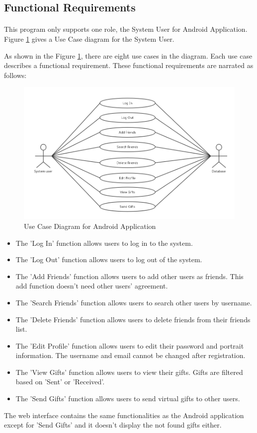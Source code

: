 \subsection{Functional Requirements}
\label{FunctionalRequirements}
\paragraph{}
This program only supports one role, the System User for Android Application. Figure \ref{Use Cases Diagram} gives a Use Case diagram for the System User.
\par As shown in the Figure \ref{Use Cases Diagram}, there are eight use cases in the diagram. Each use case describes a functional requirement. These functional requirements are narrated as follows:

\begin{figure}[htb]
\centering
\includegraphics[width=.5\textwidth]{section02/assets/UseCase.png}
\caption[Use Case Diagram for Android Application]{\label{Use Cases Diagram}Use Case Diagram for Android Application}
\end{figure}

\begin{itemize}
\item The 'Log In' function allows users to log in to the system.
\item The 'Log Out' function allows users to log out of the system.
\item The 'Add Friends' function allows users to add other users as friends. This add function doesn't need other users' agreement.
\item The 'Search Friends' function allows users to search other users by username.
\item The 'Delete Friends' function allows users to delete friends from their friends list.
\item The 'Edit Profile' function allows users to edit their password and portrait information. The username and email cannot be changed after registration. 
\item The 'View Gifts' function allows users to view their gifts. Gifts are filtered based on 'Sent' or 'Received'.
\item The 'Send Gifts' function allows users to send virtual gifts to other users.
\end{itemize}
\par The web interface contains the same functionalities as the Android application except for 'Send Gifts' and it doesn't display the not found gifts either.